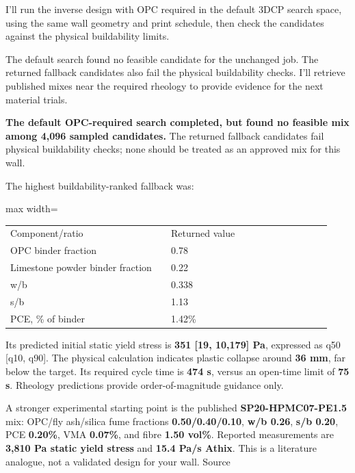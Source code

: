 \begin{agentbox}
I'll run the inverse design with OPC required in the default 3DCP search space, using the same wall geometry and print schedule, then check the candidates against the physical buildability limits.\par
The default search found no feasible candidate for the unchanged job. The returned fallback candidates also fail the physical buildability checks. I'll retrieve published mixes near the required rheology to provide evidence for the next material trials.\par
\textbf{The default OPC-required search completed, but found no feasible mix among 4,096 sampled candidates.} The returned fallback candidates fail physical buildability checks; none should be treated as an approved mix for this wall.\par
\par
The highest buildability-ranked fallback was:\par
\par
\par\smallskip\begin{adjustbox}{max width=\linewidth}\begin{tabular}{p{0.47\linewidth}p{0.47\linewidth}}
Component/ratio & Returned value \\
OPC binder fraction & 0.78 \\
Limestone powder binder fraction & 0.22 \\
w/b & 0.338 \\
s/b & 1.13 \\
PCE, \% of binder & 1.42\% \\
\end{tabular}\end{adjustbox}\par\smallskip
\par
Its predicted initial static yield stress is \textbf{351 [19, 10,179] Pa}, expressed as q50 [q10, q90]. The physical calculation indicates plastic collapse around \textbf{36 mm}, far below the target. Its required cycle time is \textbf{474 s}, versus an open-time limit of \textbf{75 s}. Rheology predictions provide order-of-magnitude guidance only.\par
\par
A stronger experimental starting point is the published \textbf{SP20-HPMC07-PE1.5} mix: OPC/fly ash/silica fume fractions \textbf{0.50/0.40/0.10}, \textbf{w/b 0.26}, \textbf{s/b 0.20}, PCE \textbf{0.20\%}, VMA \textbf{0.07\%}, and fibre \textbf{1.50 vol\%}. Reported measurements are \textbf{3,810 Pa static yield stress} and \textbf{15.4 Pa/s Athix}. This is a literature analogue, not a validated design for your wall. Source\par

\end{agentbox}
